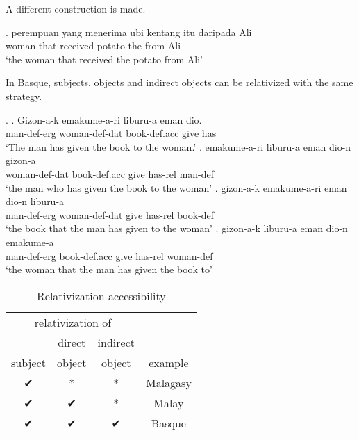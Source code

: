 A different construction is made.

\exg. perempuan yang menerima {ubi kentang} itu daripada Ali\\
 woman that received potato the from Ali\\
 `the woman that received the potato from Ali'

In Basque, subjects, objects and indirect objects can be relativized with the same strategy.

\ex.
\ag. Gizon-a-k emakume-a-ri liburu-a eman dio.\\
 man-\ac{def}-\ac{erg} woman-\ac{def}-\ac{dat} book-\ac{def}.\ac{acc} give has\\
 `The man has given the book to the woman.'
\bg. emakume-a-ri liburu-a eman dio-n gizon-a\\
 woman-\ac{def}-\ac{dat} book-\ac{def}.\ac{acc} give has-\ac{rel} man-\ac{def}\\
 `the man who has given the book to the woman'
\bg. gizon-a-k emakume-a-ri eman dio-n liburu-a\\
 man-\ac{def}-\ac{erg} woman-\ac{def}-\ac{dat} give has-\ac{rel} book-\ac{def}\\
 `the book that the man has given to the woman'
\bg. gizon-a-k liburu-a eman dio-n emakume-a\\
 man-\ac{def}-\ac{erg} book-\ac{def}.\ac{acc} give has-\ac{rel} woman-\ac{def}\\
 `the woman that the man has given the book to' 




 \begin{table}[H]
   \center
   \caption {Relativization accessibility}
     \begin{tabular}{cccc}
       \toprule
             \multicolumn{3}{c}{relativization of}
           & \\
       \cmidrule{1-3}
             & direct
             & indirect
           & \\
             subject
             & object
             & object
           & example \\
       \cmidrule{1-3} \cmidrule{4-4}
             ✔
             & *
             & *
           & Malagasy \\
             ✔
             & ✔
             & *
           & Malay \\
             ✔
             & ✔
             & ✔
           & Basque \\
       \bottomrule
     \end{tabular}
 \end{table}






